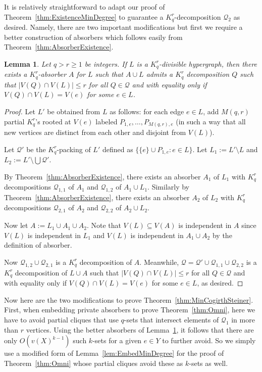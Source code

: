 \documentclass[11pt]{article}
\newcounter{i}
\theoremstyle{plain}
\newtheorem{lem}[thm]{Lemma}
\theoremstyle{plain} %
\theoremstyle{definition}
\begin{document}
It is relatively straightforward to adapt our proof of Theorem~\ref{thm:ExistenceMinDegree} to guarantee a $K_q^r$-decomposition $\mathcal{Q}_2$ as desired. Namely, there are two important modifications but first we require a better construction of absorbers which follows easily from Theorem~\ref{thm:AbsorberExistence}.

\begin{lem}\label{lem:BetterAbsorber}
Let $q > r\ge 1$ be integers. If $L$ is a $K_q^r$-divisible hypergraph, then there exists a $K_q^r$-absorber $A$ for $L$ such that $A\cup L$ admits a $K_q^r$ decomposition $Q$ such that $|V(Q)\cap V(L)|\le r$ for all $Q\in \mathcal{Q}$ and with equality only if $V(Q)\cap V(L) = V(e)$ for some $e\in L$.
\end{lem}
\begin{proof}
Let $L'$ be obtained from $L$ as follows: for each edge $e\in L$, add $M(q,r)$ partial $K_q^r$'s rooted at $V(e)$ labeled $P_{1,e},\ldots, P_{M(q,r),e}$ (in such a way that all new vertices are distinct from each other and disjoint from $V(L)$).

Let $\mathcal{Q}'$ be the $K_q^r$-packing of $L'$ defined as $\{ \{e\}\cup P_{1,e}: e\in L\}$. Let $L_1 := L'\setminus L$ and $L_2:= L'\setminus \bigcup \mathcal{Q}'$. 

By Theorem~\ref{thm:AbsorberExistence}, there exists an absorber $A_1$ of $L_1$ with $K_q^r$ decompositions $\mathcal{Q}_{1,1}$ of $A_1$ and $\mathcal{Q}_{1,2}$ of $A_1\cup L_1$. Similarly by Theorem~\ref{thm:AbsorberExistence}, there exists an absorber $A_2$ of $L_2$ with $K_q^r$ decompositions $\mathcal{Q}_{2,1}$ of $A_2$ and $\mathcal{Q}_{2,2}$ of $A_2\cup L_2$.

Now let $A:= L_1\cup A_1\cup A_2$. Note that $V(L)\subseteq V(A)$ is independent in $A$ since $V(L)$ is independent in $L_1$ and $V(L)$ is independent in $A_1\cup A_2$ by the definition of absorber.

Now $\mathcal{Q}_{1,2}\cup \mathcal{Q}_{2,1}$ is a $K_q^r$ decomposition of $A$. Meanwhile, $\mathcal{Q} = \mathcal{Q}'\cup \mathcal{Q}_{1,1}\cup \mathcal{Q}_{2,2}$ is a $K_q^r$ decomposition of $L\cup A$ such that $|V(Q)\cap V(L)|\le r$ for all $Q\in \mathcal{Q}$ and with equality only if $V(Q)\cap V(L) = V(e)$ for some $e\in L$, as desired.
\end{proof}

Now here are the two modifications to prove Theorem~\ref{thm:MinCogirthSteiner}. First, when embedding private absorbers to prove Theorem~\ref{thm:Omni}, here we have to avoid partial cliques that use $q$-sets that intersect elements of $\mathcal{Q}_1$ in more than $r$ vertices. Using the better absorbers of Lemma~\ref{lem:BetterAbsorber}, it follows that there are only $O(v(X)^{k-1})$ such $k$-sets for a given $e\in Y$ to further avoid. So we simply use a modified form of Lemma~\ref{lem:EmbedMinDegree} for the proof of Theorem~\ref{thm:Omni} whose partial cliques avoid these as $k$-sets as well. 
\end{document}
